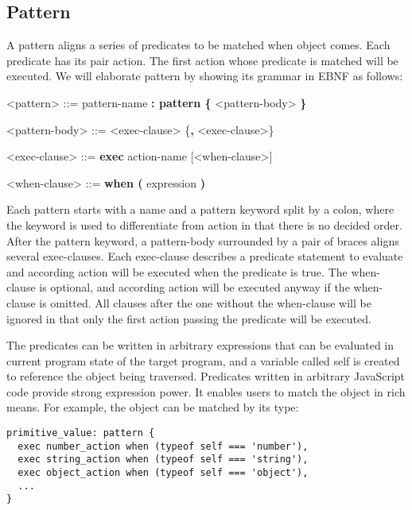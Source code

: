 \subsection {Pattern}
A pattern aligns a series of predicates to be matched when object comes. Each predicate has its pair action. The first action whose predicate is matched will be executed. We will elaborate pattern by showing its grammar in EBNF as follows:

\begin{center}
  \begin{minipage}{0.8\linewidth}
    \begin{grammar}
      <pattern> ::= pattern-name \textbf{: pattern \{} <pattern-body> \textbf{\}}

      <pattern-body> ::= <exec-clause> \{\textbf{,} <exec-clause>\}

      <exec-clause> ::= \textbf{exec} action-name [<when-clause>]

      <when-clause> ::= \textbf{when (} expression \textbf{)}
    \end{grammar}
  \end{minipage}
\end{center}

Each pattern starts with a name and a pattern keyword split by a colon, where the keyword is used to differentiate from action in that there is no decided order. After the pattern keyword, a pattern-body surrounded by a pair of braces aligns several exec-clauses. Each exec-clause describes a predicate statement to evaluate and according action will be executed when the predicate is true. The when-clause is optional, and according action will be executed anyway if the when-clause is omitted. All clauses after the one without the when-clause will be ignored in that only the first action passing the predicate will be executed.

The predicates can be written in arbitrary expressions that can be evaluated in current program state of the target program, and a variable called self is created to reference the object being traversed. Predicates written in arbitrary JavaScript code provide strong expression power. It enables users to match the object in rich means. For example, the object can be matched by its type:

\begin{lstlisting}
primitive_value: pattern {
  exec number_action when (typeof self === 'number'),
  exec string_action when (typeof self === 'string'),
  exec object_action when (typeof self === 'object'),
  ...
}
\end{lstlisting}

